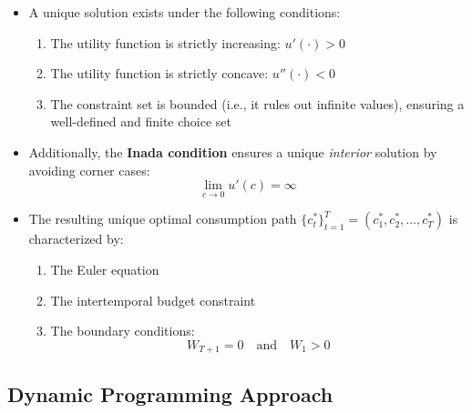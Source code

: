 \documentclass[12pt]{article}
\begin{document}
\begin{itemize}
    \item A unique solution exists under the following conditions:
    \begin{enumerate}
        \item The utility function is strictly increasing: \( u'(\cdot) > 0 \)
        \item The utility function is strictly concave: \( u''(\cdot) < 0 \)
        \item The constraint set is bounded (i.e., it rules out infinite values), ensuring a well-defined and finite choice set
    \end{enumerate}

    \item Additionally, the \textbf{Inada condition} ensures a unique \textit{interior} solution by avoiding corner cases:
    \[
    \lim_{c \to 0} u'(c) = \infty
    \]

    \item The resulting unique optimal consumption path \( \{c_t^*\}_{t=1}^{T} = (c_1^*, c_2^*, \dots, c_T^*) \) is characterized by:
    \begin{enumerate}
        \item The Euler equation
        \item The intertemporal budget constraint
        \item The boundary conditions:
        \[
        W_{T+1} = 0 \quad \text{and} \quad W_1 > 0
        \]
    \end{enumerate}
\end{itemize}

\subsection*{\noindent\textbf{Dynamic Programming Approach}}
\end{document}
